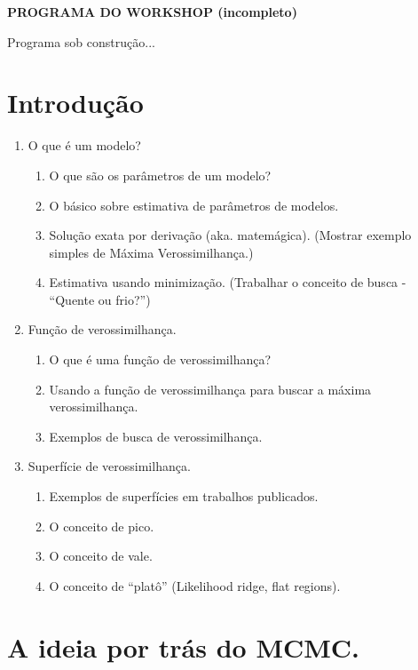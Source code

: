 \documentclass[10pt,a4paper]{article}
\begin{document}
\begin{center}
{\LARGE \textbf{PROGRAMA DO WORKSHOP (incompleto)}}
\end{center}

Programa sob construção...

\section{Introdução}

\begin{enumerate}
\item O que é um modelo?

	\begin{enumerate}
	\item O que são os parâmetros de um modelo?
	\item O básico sobre estimativa de parâmetros de modelos.
	\item Solução exata por derivação (aka. matemágica). (Mostrar exemplo simples de Máxima Verossimilhança.)
	\item Estimativa usando minimização. (Trabalhar o conceito de busca - “Quente ou frio?”)
	\end{enumerate}
	
\item Função de verossimilhança.
	\begin{enumerate}
	\item O que é uma função de verossimilhança?
	\item Usando a função de verossimilhança para buscar a máxima verossimilhança.
	\item Exemplos de busca de verossimilhança.
	\end{enumerate}
	
\item Superfície de verossimilhança.
	\begin{enumerate}
	\item Exemplos de superfícies em trabalhos publicados.
	\item O conceito de pico.
	\item O conceito de vale.
	\item O conceito de “platô” (Likelihood ridge, flat regions).
	\end{enumerate}	
	
\end{enumerate}

\section{A ideia por trás do MCMC.}
\end{document}
